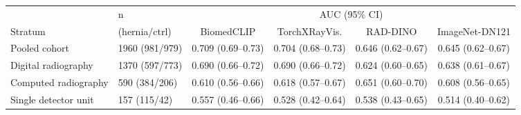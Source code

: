\begin{tabular}{llcccc}
\toprule
& n & \multicolumn{4}{c}{AUC (95\% CI)} \\
\cmidrule(lr){3-6}
Stratum & (hernia/ctrl) & BiomedCLIP & TorchXRayVis. & RAD-DINO & ImageNet-DN121 \\
\midrule
Pooled cohort & 1960 (981/979) & 0.709 (0.69--0.73) & 0.704 (0.68--0.73) & 0.646 (0.62--0.67) & 0.645 (0.62--0.67) \\
Digital radiography & 1370 (597/773) & 0.690 (0.66--0.72) & 0.690 (0.66--0.72) & 0.624 (0.60--0.65) & 0.638 (0.61--0.67) \\
Computed radiography & 590 (384/206) & 0.610 (0.56--0.66) & 0.618 (0.57--0.67) & 0.651 (0.60--0.70) & 0.608 (0.56--0.65) \\
Single detector unit & 157 (115/42) & 0.557 (0.46--0.66) & 0.528 (0.42--0.64) & 0.538 (0.43--0.65) & 0.514 (0.40--0.62) \\
\bottomrule
\end{tabular}

